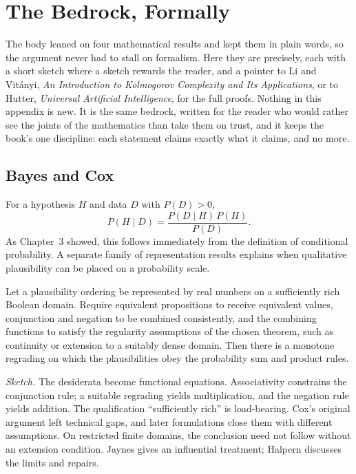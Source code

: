 \chapter{The Bedrock, Formally}\label{app:bedrock}

The body leaned on four mathematical results and kept them in plain words, so the argument never had to stall on formalism. Here they are precisely, each with a short sketch where a sketch rewards the reader, and a pointer to Li and Vit\'anyi, \textit{An Introduction to Kolmogorov Complexity and Its Applications}, or to Hutter, \textit{Universal Artificial Intelligence}, for the full proofs. Nothing in this appendix is new. It is the same bedrock, written for the reader who would rather see the joints of the mathematics than take them on trust, and it keeps the book's one discipline: each statement claims exactly what it claims, and no more.

\section*{Bayes and Cox}

For a hypothesis $H$ and data $D$ with $P(D) > 0$,
$$P(H \mid D) = \frac{P(D \mid H)\, P(H)}{P(D)}.$$
As Chapter~3 showed, this follows immediately from the definition of conditional probability. A separate family of representation results explains when qualitative plausibility can be placed on a probability scale.

\begin{theorem}
Let a plausibility ordering be represented by real numbers on a sufficiently rich Boolean domain. Require equivalent propositions to receive equivalent values, conjunction and negation to be combined consistently, and the combining functions to satisfy the regularity assumptions of the chosen theorem, such as continuity or extension to a suitably dense domain. Then there is a monotone regrading on which the plausibilities obey the probability sum and product rules.
\end{theorem}

\emph{Sketch.} The desiderata become functional equations. Associativity constrains the conjunction rule; a suitable regrading yields multiplication, and the negation rule yields addition. The qualification ``sufficiently rich'' is load-bearing. Cox's original argument left technical gaps, and later formulations close them with different assumptions. On restricted finite domains, the conclusion need not follow without an extension condition. Jaynes gives an influential treatment; Halpern discusses the limits and repairs.


